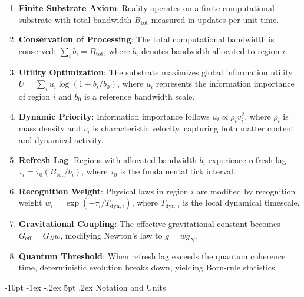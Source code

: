 \documentclass[12pt,letterpaper]{book}
\makeatletter
\renewcommand\section{\@startsection{section}{1}{\z@}%
  {-10pt \@plus -1ex \@minus -.2ex}%
  {5pt \@plus.2ex}%
  {\normalfont\large\bfseries}}
\makeatother
\begin{document}
\begin{enumerate}
\item \textbf{Finite Substrate Axiom}: Reality operates on a finite computational substrate with total bandwidth $B_{\text{tot}}$ measured in updates per unit time.

\item \textbf{Conservation of Processing}: The total computational bandwidth is conserved: $\sum_i b_i = B_{\text{tot}}$, where $b_i$ denotes bandwidth allocated to region $i$.

\item \textbf{Utility Optimization}: The substrate maximizes global information utility $U = \sum_i u_i \log(1 + b_i/b_0)$, where $u_i$ represents the information importance of region $i$ and $b_0$ is a reference bandwidth scale.

\item \textbf{Dynamic Priority}: Information importance follows $u_i \propto \rho_i v_i^2$, where $\rho_i$ is mass density and $v_i$ is characteristic velocity, capturing both matter content and dynamical activity.

\item \textbf{Refresh Lag}: Regions with allocated bandwidth $b_i$ experience refresh lag $\tau_i = \tau_0(B_{\text{tot}}/b_i)$, where $\tau_0$ is the fundamental tick interval.

\item \textbf{Recognition Weight}: Physical laws in region $i$ are modified by recognition weight $w_i = \exp(-\tau_i/T_{\text{dyn},i})$, where $T_{\text{dyn},i}$ is the local dynamical timescale.

\item \textbf{Gravitational Coupling}: The effective gravitational constant becomes $G_{\text{eff}} = G_N w$, modifying Newton's law to $g = w g_N$.

\item \textbf{Quantum Threshold}: When refresh lag exceeds the quantum coherence time, deterministic evolution breaks down, yielding Born-rule statistics.
\end{enumerate}

\section{Notation and Units}
\end{document}
